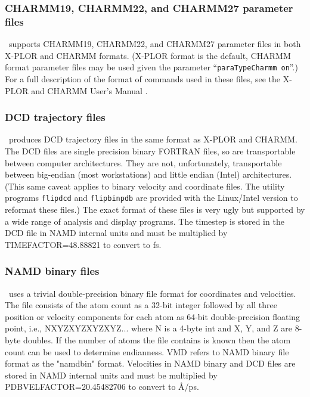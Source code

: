 \subsubsection{CHARMM19, CHARMM22, and CHARMM27 parameter files}

\NAMD\ supports CHARMM19, CHARMM22, and CHARMM27 parameter files in both
X-PLOR and CHARMM formats.
(X-PLOR format is the default, CHARMM format parameter files
may be used given the parameter ``{\tt paraTypeCharmm on}''.)
For a full description of the format of commands 
used in these files, see the X-PLOR and CHARMM User's Manual 
.  

\subsubsection{DCD trajectory files}

\NAMD\ produces DCD trajectory files in the same format as 
X-PLOR and CHARMM.  
The DCD files are single precision binary FORTRAN files, 
so are transportable between computer architectures.  
They are not, unfortunately, transportable between big-endian (most
workstations) and little endian (Intel) architectures.
(This same caveat applies to binary velocity and coordinate files.
The utility programs {\tt flipdcd} and {\tt flipbinpdb} are
provided with the Linux/Intel version to reformat these files.)
The exact format of these files is very ugly but supported by 
a wide range of analysis and display programs.  
The timestep is stored in the DCD file in NAMD internal units
and must be multiplied by TIMEFACTOR=48.88821 to convert to fs.

\subsubsection{NAMD binary files}

\NAMD\ uses a trivial double-precision binary file format for
coordinates and velocities.  The file consists of the atom count
as a 32-bit integer followed by all three position or velocity
components for each atom as 64-bit double-precision floating point,
i.e., NXYZXYZXYZXYZ... where N is a 4-byte int and X, Y, and Z
are 8-byte doubles.  If the number of atoms the file contains is
known then the atom count can be used to determine endianness.
VMD refers to NAMD binary file format as the "namdbin" format.
Velocities in NAMD binary and DCD files are stored in NAMD internal
units and must be multiplied by PDBVELFACTOR=20.45482706
to convert to \AA/ps.

